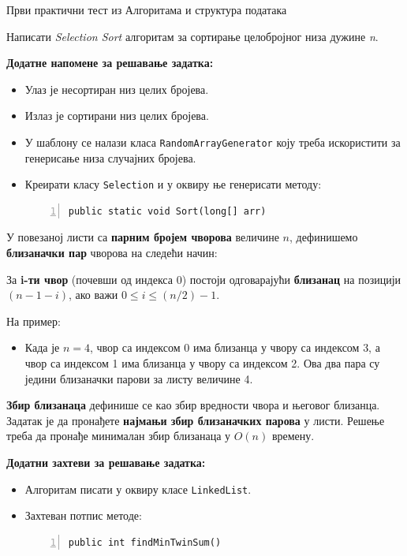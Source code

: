
Први практични тест из Алгоритама и структура података

Написати \textit{Selection Sort} алгоритам за сортирање целобројног низа дужине \textit{n}.

\textbf{Додатне напомене за решавање задатка:}
\begin{itemize}
    \item Улаз је несортиран низ целих бројева.
    \item Излаз је сортирани низ целих бројева.
    \item У шаблону се налази класа \texttt{RandomArrayGenerator} коју треба искористити за генерисање низа случајних бројева.
    \item Креирати класу \texttt{Selection} и у оквиру ње генерисати методу:
    \begin{Verbatim}[fontsize=\footnotesize, numbers=left, xleftmargin=10mm]
public static void Sort(long[] arr)
    \end{Verbatim}
\end{itemize}



У повезаној листи са \textbf{парним бројем чворова} величине $n$, дефинишемо \textbf{близаначки пар} чворова на следећи начин:

За \textbf{i-ти чвор} (почевши од индекса 0) постоји одговарајући \textbf{близанац} на позицији $(n-1-i)$, ако важи $0 \leq i \leq (n/2)-1$.

На пример:
\begin{itemize}
    \item Када је $n=4$, чвор са индексом 0 има близанца у чвору са индексом 3, а чвор са индексом 1 има близанца у чвору са индексом 2. Ова два пара су једини близаначки парови за листу величине 4.
\end{itemize}

\textbf{Збир близанаца} дефинише се као збир вредности чвора и његовог близанца. Задатак је да пронађете \textbf{најмањи збир близаначких парова} у листи. Решење треба да пронађе минималан збир близанаца у $O(n)$ времену.

\textbf{Додатни захтеви за решавање задатка:}
\begin{itemize}
    \item Алгоритам писати у оквиру класе \texttt{LinkedList}.
    \item Захтеван потпис методе:
    \begin{Verbatim}[fontsize=\footnotesize, numbers=left, xleftmargin=10mm]
public int findMinTwinSum()
    \end{Verbatim}
\end{itemize}


